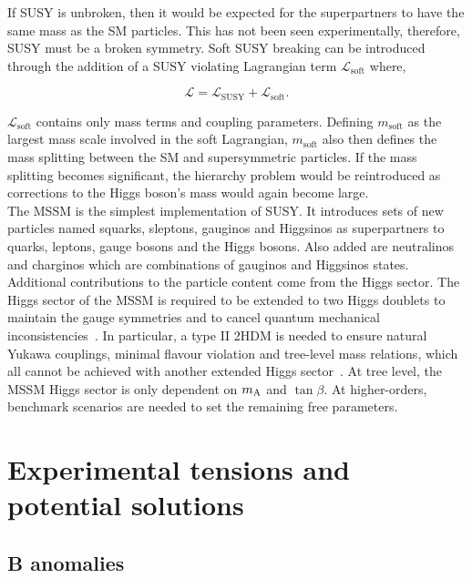 If \ac{SUSY} is unbroken, then it would be expected for the superpartners to have the same mass as the \ac{SM} particles. 
This has not been seen experimentally, therefore, \ac{SUSY} must be a broken symmetry. 
Soft \ac{SUSY} breaking can be introduced through the addition of a \ac{SUSY} violating Lagrangian term $\mathcal{L}_{\text{soft}}$ where,

\begin{equation}
    \mathcal{L} = \mathcal{L}_{\text{SUSY}} + \mathcal{L}_{\text{soft}}.
\end{equation}

$\mathcal{L}_{\text{soft}}$ contains only mass terms and coupling parameters. 
Defining $m_{\text{soft}}$ as the largest mass scale involved in the soft Lagrangian, $m_{\text{soft}}$ also then defines the mass splitting between the \ac{SM} and supersymmetric particles. 
If the mass splitting becomes significant, the hierarchy problem would be reintroduced as corrections to the Higgs boson's mass would again become large. \\

The \ac{MSSM} is the simplest implementation of \ac{SUSY}.
It introduces sets of new particles named squarks, sleptons, gauginos and Higgsinos as superpartners to quarks, leptons, gauge bosons and the Higgs bosons.
Also added are neutralinos and charginos which are combinations of gauginos and Higgsinos states.
Additional contributions to the particle content come from the Higgs sector.
The Higgs sector of the \ac{MSSM} is required to be extended to two Higgs doublets to maintain the gauge symmetries and to cancel quantum mechanical inconsistencies~\cite{SUSY_Primer}.
In particular, a type II \ac{2HDM} is needed to ensure natural Yukawa couplings, minimal flavour violation and tree-level mass relations, which all cannot be achieved with another extended Higgs sector~\cite{SUSY_Primer}.
At tree level, the \ac{MSSM} Higgs sector is only dependent on $m_{{\text{A}}}$ and $\tan\beta$.
At higher-orders, benchmark scenarios are needed to set the remaining free parameters.

\section{Experimental tensions and potential solutions}

\subsection{B anomalies}
\label{sec:b_anomalies}

